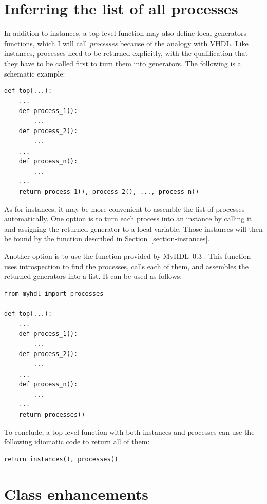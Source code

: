 \documentclass{howto}
\newcommand{\myhdl}{\protect \mbox{MyHDL}}
\begin{document}
\section{Inferring the list of all processes\label{section-processes}}

In addition to instances, a top level function may
also define local generators functions, which I will
call \emph{processes} because of the analogy with VHDL.
Like instances, processes need to be returned explicitly,
with the qualification that they have to be called first
to turn them into generators. The following is a schematic
example:

\begin{verbatim}
def top(...):
    ...
    def process_1():
        ...
    def process_2():
        ...
    ...
    def process_n():
        ...
    ...
    return process_1(), process_2(), ..., process_n()
\end{verbatim}

As for instances, it may be more convenient to assemble the list of
processes automatically. One option is to turn each process into an
instance by calling it and assigning the returned generator to a local
variable. Those instances will then be found by the
 function described in
Section~\ref{section-instances}.

Another option is to use the function  provided
by \myhdl\ 0.3 . This function uses introspection to find the
processes, calls each of them, and assembles the returned generators
into a list. It can be used as follows:

\begin{verbatim}
from myhdl import processes

def top(...):
    ...
    def process_1():
        ...
    def process_2():
        ...
    ...
    def process_n():
        ...
    ... 
    return processes()
\end{verbatim}

To conclude, a top level function with both instances and processes
can use the following idiomatic code to return all of them:

\begin{verbatim}
return instances(), processes()
\end{verbatim}

\section{Class  enhancements\label{section-intbv}}
\end{document}
